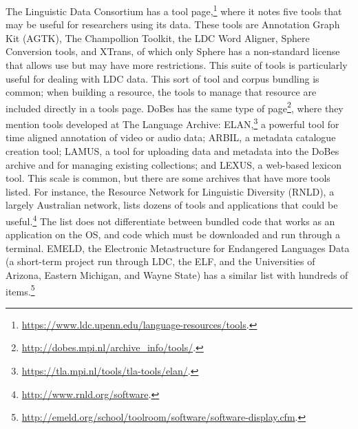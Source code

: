 The Linguistic Data Consortium has a tool page,\footnote{\href{https://www.ldc.upenn.edu/language-resources/tools}{https://www.ldc.upenn.edu/language-resources/tools}. } where it notes five tools that may be useful for researchers using its data. These tools are Annotation Graph Kit (AGTK), The Champollion Toolkit, the LDC Word Aligner, Sphere Conversion tools, and XTrans, of which only Sphere has a non-standard license that allows use but may have more restrictions. This suite of tools is particularly useful for dealing with LDC data. This sort of tool and corpus bundling is common; when building a resource, the tools to manage that resource are included directly in a tools page. DoBes has the same type of page\footnote{\href{http://dobes.mpi.nl/archive_info/tools/}{http://dobes.mpi.nl/archive\_info/tools/}. }, where they mention tools developed at The Language Archive: ELAN,\footnote{\href{https://tla.mpi.nl/tools/tla-tools/elan/}{https://tla.mpi.nl/tools/tla-tools/elan/}. } a powerful tool for time aligned annotation of video or audio data; ARBIL, a metadata catalogue creation tool; LAMUS, a tool for uploading data and metadata into the DoBes archive and for managing existing collections; and LEXUS, a web-based lexicon tool. This scale is common, but there are some archives that have more tools listed. For instance, the Resource Network for Linguistic Diversity (RNLD), a largely Australian network, lists dozens of tools and applications that could be useful.\footnote{\href{http://www.rnld.org/software}{http://www.rnld.org/software}. } The list does not differentiate between bundled code that works as an application on the OS, and code which must be downloaded and run through a terminal. EMELD, the Electronic Metastructure for Endangered Languages Data (a short-term project run through LDC, the ELF, and the Universities of Arizona, Eastern Michigan, and Wayne State) has a similar list with hundreds of items.\footnote{\href{http://emeld.org/school/toolroom/software/software-display.cfm}{http://emeld.org/school/toolroom/software/software-display.cfm}. }

